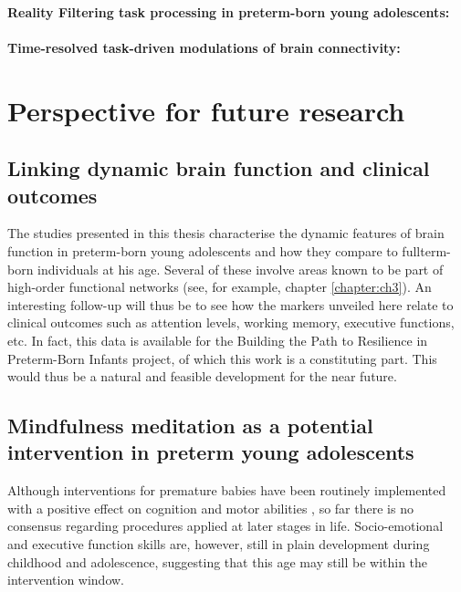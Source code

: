 
\paragraph{Reality Filtering task processing in preterm-born young adolescents:}

\paragraph{Time-resolved task-driven modulations of brain connectivity:}

\section{Perspective for future research}


\subsection*{Linking dynamic brain function and clinical outcomes}
The studies presented in this thesis characterise the dynamic features of brain function in preterm-born young adolescents and how they compare to fullterm-born individuals at his age. Several of these involve areas known to be part of high-order functional networks (see, for example, chapter \ref{chapter:ch3}). An interesting follow-up will thus be to see how the markers unveiled here relate to clinical outcomes such as attention levels, working memory, executive functions, etc. In fact, this data is available for the Building the Path to Resilience in Preterm-Born Infants project, of which this work is a constituting part. This would thus be a natural and feasible development for the near future.

\subsection*{Mindfulness meditation as a potential intervention in preterm young adolescents}

 Although interventions for premature babies have been routinely implemented with a positive effect on cognition and  motor abilities \citep{Ferreira2020}, so far there is no consensus regarding procedures applied at later stages in life. Socio-emotional and executive function skills are, however, still in plain development during childhood and adolescence, suggesting that this age may still be within the intervention window.


